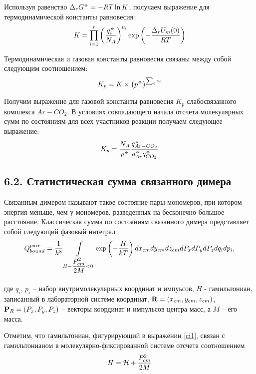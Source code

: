 Используя равенство $\Delta_r G^{\barcirc} = - RT \ln K$, получаем выражение для термодинамической константы равновесия:
\vverh
\begin{gather}
	K = \prod_{i = 1}^{r} \lb \frac{q_i^{\barcirc}}{N_A} \rb^{\nu_i} \exp \lb - \frac{\Delta_r U_m (0)}{RT} \rb \notag
\end{gather}

Термодинамическая и газовая константы равновесия связаны между собой следующим соотношением: 
\vverh
\begin{gather}
	K_p =  K \times \lb p^{\barcirc} \rb^{\sum_i \nu_i} \notag 
\end{gather}

Получим выражение для газовой константы равновесия $K_p$ слабосвязанного комплекса $Ar-CO_2$. В условиях совпадающего начала отсчета молекулярных сумм по состояниям для всех участников реакции получаем следующее выражение:
\vverh
\begin{gather}
	K_p = \frac{N_A}{p^{\barcirc}} \frac{q_{Ar-CO_2}^{\barcirc}}{q_{Ar}^{\barcirc} q_{CO_2}^{\barcirc}} \label{eqconst}
\end{gather}

\subsection*{\textbf{6.2.} Статистическая сумма связанного димера} 

Связанным димером называют такое состояние пары мономеров, при котором энергия меньше, чем у мономеров, разведенных на бесконечно большое расстояние. Классическая сумма по состояниям связанного димера представляет собой следующий фазовый интеграл
\vverh
\begin{gather}
	Q_{bound}^{pair} = \frac{1}{h^8} \int\limits_{H - \frac{\displaystyle \strut P_{cm}^2}{\displaystyle \strut 2 M} < 0} \exp \left( - \frac{H}{k T} \right) d x_{cm} d y_{cm} d z_{cm} d P_{x} d P_{y} d P_{z} d q_i d p_i, \label{ci1}
\end{gather}

где $q_i$, $p_i$ -- набор внутримолекулярных координат и импуьсов, $H$ - гамильтониан, записанный в лабораторной системе координат, $\mathbf{R} = \left( x_{cm}, y_{cm}, z_{cm} \right)$, $\mathbf{P}_R = \left( P_x, P_y, P_z \right)$ -- векторы координат и импульсов центра масс, а $M$ -- его масса. \par
Отметим, что гамильтониан, фигурирующий в выражении \eqref{ci1}, связан с гамильтонианом в молекулярно-фиксированной системе отсчета соотношением
\vverh
\begin{gather}
	H = \mathcal{H} + \frac{P_{cm}^2}{2 M} \notag
\end{gather}

